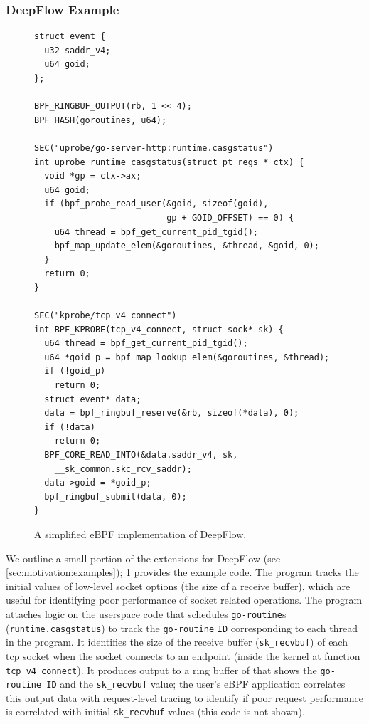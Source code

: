 \subsubsection{DeepFlow Example}
\begin{figure}[t]
\centering
\begin{verbatim}
struct event {
  u32 saddr_v4;
  u64 goid;
};

BPF_RINGBUF_OUTPUT(rb, 1 << 4);
BPF_HASH(goroutines, u64);

SEC("uprobe/go-server-http:runtime.casgstatus")
int uprobe_runtime_casgstatus(struct pt_regs * ctx) {
  void *gp = ctx->ax;
  u64 goid;
  if (bpf_probe_read_user(&goid, sizeof(goid),
                          gp + GOID_OFFSET) == 0) {
    u64 thread = bpf_get_current_pid_tgid();
    bpf_map_update_elem(&goroutines, &thread, &goid, 0);
  }
  return 0;
}

SEC("kprobe/tcp_v4_connect")
int BPF_KPROBE(tcp_v4_connect, struct sock* sk) {
  u64 thread = bpf_get_current_pid_tgid();
  u64 *goid_p = bpf_map_lookup_elem(&goroutines, &thread);
  if (!goid_p)
    return 0;
  struct event* data;
  data = bpf_ringbuf_reserve(&rb, sizeof(*data), 0);
  if (!data)
    return 0;
  BPF_CORE_READ_INTO(&data.saddr_v4, sk,
    __sk_common.skc_rcv_saddr);
  data->goid = *goid_p;
  bpf_ringbuf_submit(data, 0);
}
\end{verbatim}
\vspace{-0.5cm}
\caption{A simplified eBPF implementation of DeepFlow. }  \label{code:example}
\vspace{-0.5cm}
\end{figure}
We outline a small portion of the extensions for DeepFlow (see \cref{sec:motivation:examples}); \cref{code:example} provides the example code.  The program tracks the initial values of low-level socket options (\eg the size of a receive buffer), which are useful for identifying poor performance of socket related operations.  The program attaches logic on the userspace code that schedules \texttt{go-routine}s (\texttt{runtime.casgstatus}) to track the \texttt{go-routine} \texttt{ID} corresponding to each thread in the program.  It identifies the size of the receive buffer (\texttt{sk\_recvbuf}) of each tcp socket when the socket connects to an endpoint (inside the kernel at function \texttt{tcp_v4_connect}).  It produces output to a ring buffer of that shows the \texttt{go-routine ID} and the \texttt{sk\_recvbuf} value; the user's eBPF application correlates this output data with request-level tracing to identify if poor request performance is correlated with initial \texttt{sk\_recvbuf} values (this code is not shown).



